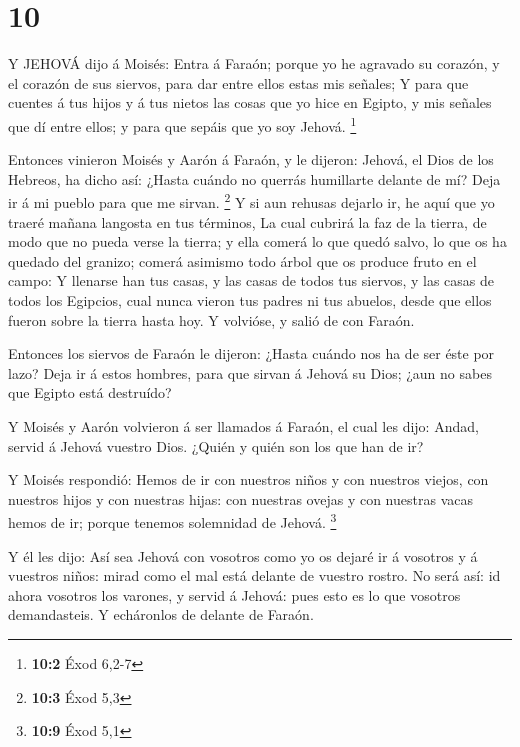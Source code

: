 \hypertarget{section-9}{%
\section{10}\label{section-9}}

 Y JEHOVÁ dijo á Moisés: Entra á Faraón; porque yo he
agravado su corazón, y el corazón de sus siervos, para dar entre ellos
estas mis señales;  Y para que cuentes á tus hijos y á tus
nietos las cosas que yo hice en Egipto, y mis señales que dí entre
ellos; y para que sepáis que yo soy Jehová. \footnote{\textbf{10:2} Éxod
  6,2-7}

 Entonces vinieron Moisés y Aarón á Faraón, y le dijeron:
Jehová, el Dios de los Hebreos, ha dicho así: ¿Hasta cuándo no querrás
humillarte delante de mí? Deja ir á mi pueblo para que me sirvan.
\footnote{\textbf{10:3} Éxod 5,3}  Y si aun rehusas dejarlo
ir, he aquí que yo traeré mañana langosta en tus términos, 
La cual cubrirá la faz de la tierra, de modo que no pueda verse la
tierra; y ella comerá lo que quedó salvo, lo que os ha quedado del
granizo; comerá asimismo todo árbol que os produce fruto en el campo:
 Y llenarse han tus casas, y las casas de todos tus siervos,
y las casas de todos los Egipcios, cual nunca vieron tus padres ni tus
abuelos, desde que ellos fueron sobre la tierra hasta hoy. Y volvióse, y
salió de con Faraón.

 Entonces los siervos de Faraón le dijeron: ¿Hasta cuándo
nos ha de ser éste por lazo? Deja ir á estos hombres, para que sirvan á
Jehová su Dios; ¿aun no sabes que Egipto está destruído?

 Y Moisés y Aarón volvieron á ser llamados á Faraón, el cual
les dijo: Andad, servid á Jehová vuestro Dios. ¿Quién y quién son los
que han de ir?

 Y Moisés respondió: Hemos de ir con nuestros niños y con
nuestros viejos, con nuestros hijos y con nuestras hijas: con nuestras
ovejas y con nuestras vacas hemos de ir; porque tenemos solemnidad de
Jehová. \footnote{\textbf{10:9} Éxod 5,1}

 Y él les dijo: Así sea Jehová con vosotros como yo os
dejaré ir á vosotros y á vuestros niños: mirad como el mal está delante
de vuestro rostro.  No será así: id ahora vosotros los
varones, y servid á Jehová: pues esto es lo que vosotros demandasteis. Y
echáronlos de delante de Faraón.

